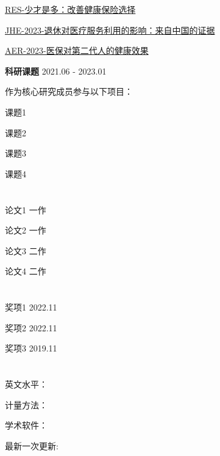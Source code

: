 \documentclass[UTF8,11pt]{ctexart}
\begin{document}
\href{https://mp.weixin.qq.com/s/Y0sbGK6QZ-_b_ZFRPz-7tA}{RES-少才是多：改善健康保险选择}

\href{https://mp.weixin.qq.com/s/sCwhARBH4hc1JWDZ_8MWQw}{JHE-2023-退休对医疗服务利用的影响：来自中国的证据}

\href{https://mp.weixin.qq.com/s/4R-zSL2FUM8iGr-EXmFGaQ}{AER-2023-医保对第二代人的健康效果}

\bigskip

\textbf{科研课题} \tab{}  \hfill 2021.06 - 2023.01

作为核心研究成员参与以下项目：

课题1

课题2

课题3

课题4

\section{\underline{}}

\hspace{2em}论文1 \hfill 一作 

论文2 \hfill 一作 

论文3 \hfill 二作 

论文4 \hfill 二作 

\section{\underline{}}

\hspace{2em}奖项1  \hfill 2022.11  

奖项2   \hfill 2022.11  

奖项3  \hfill 2019.11 

\section{\underline{}}

\hspace{2em}英文水平：

计量方法：

学术软件：


\vfill \hfill 最新一次更新: \date{\today}
\end{document}
